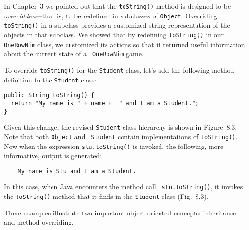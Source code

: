 In Chapter~3 we pointed out that the {\tt toString()} method is
designed to be {\em overridden}---that is, to be redefined in
subclasses of {\tt Object}. Overriding {\tt toString()} in a subclass
provides a customized string representation of the objects in that
subclass.  We showed that by redefining {\tt toString()} in our {\tt
OneRowNim} class, we customized its actions so that it returned
useful information about the current state of a {\tt
OneRowNim} game.

To override {\tt toString()} for the {\tt Student} class, let's add
the following method definition to the {\tt Student} class:

\begin{jjjlisting}
\begin{lstlisting}
public String toString() {
  return "My name is " + name +  " and I am a Student.";
}
\end{lstlisting}
\end{jjjlisting}


\noindent Given this change, the revised {\tt Student} class hierarchy
is shown in Figure~8.3.  Note that both {\tt Object} and {\tt
Student} contain implementations of {\tt toString()}. Now when the
expression {\tt stu.toString()} is invoked, the following, more
informative, output is generated:

\begin{jjjlisting}
\begin{lstlisting}
    My name is Stu and I am a Student.
\end{lstlisting}
\end{jjjlisting}

\noindent In this case, when Java encounters the method call {\tt
stu.toString()}, it invokes the {\tt toString()} method that it finds
in the {\tt Student} class (Fig.~8.3).

These examples illustrate two important object-oriented concepts:
inheritance and method overriding.



